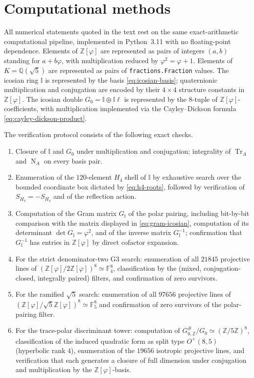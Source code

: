 \documentclass[12pt,oneside,english]{amsart}
\numberwithin{equation}{section}
\numberwithin{figure}{section}
\numberwithin{table}{section}
\theoremstyle{plain}
\theoremstyle{definition}
\theoremstyle{remark}
\newcommand{\ZZ}{\mathbb Z}
\newcommand{\QQ}{\mathbb Q}
\newcommand{\Zphi}{\mathbb Z[\varphi]}
\newcommand{\Tr}{\operatorname{Tr}}
\newcommand{\Norm}{\operatorname{N}}
\begin{document}
\section*{Computational methods}

All numerical statements quoted in the text rest on the same exact-arithmetic computational pipeline, implemented in Python~3.11 with no floating-point dependence. Elements of \(\Zphi\) are represented as pairs of integers \((a,b)\) standing for \(a+b\varphi\), with multiplication reduced by \(\varphi^2=\varphi+1\). Elements of \(K=\QQ(\sqrt5)\) are represented as pairs of \texttt{fractions.Fraction} values. The icosian ring \(\mathbb I\) is represented by the basis \eqref{eq:icosian-basis}; quaternionic multiplication and conjugation are encoded by their \(4\times 4\) structure constants in \(\Zphi\). The icosian double \(G_0=\mathbb I\oplus\mathbb I\ell\) is represented by the \(8\)-tuple of \(\Zphi\)-coefficients, with multiplication implemented via the Cayley--Dickson formula \eqref{eq:cayley-dickson-product}.

The verification protocol consists of the following exact checks.

\begin{enumerate}
\item[(P1)] Closure of \(\mathbb I\) and \(G_0\) under multiplication and conjugation; integrality of \(\Tr_A\) and \(\Norm_A\) on every basis pair.
\item[(P2)] Enumeration of the \(120\)-element \(H_4\) shell of \(\mathbb I\) by exhaustive search over the bounded coordinate box dictated by \eqref{eq:h4-roots}, followed by verification of \(S_{H_4}=-S_{H_4}\) and of the reflection action.
\item[(P3)] Computation of the Gram matrix \(G_{\mathbb I}\) of the polar pairing, including bit-by-bit comparison with the matrix displayed in \eqref{eq:gram-icosian}, computation of its determinant \(\det G_{\mathbb I}=\varphi^{2}\), and of the inverse matrix \(G_{\mathbb I}^{-1}\); confirmation that \(G_{\mathbb I}^{-1}\) has entries in \(\Zphi\) by direct cofactor expansion.
\item[(P4)] For the strict denominator-two G3 search: enumeration of all \(21845\) projective lines of \((\Zphi/2\Zphi)^{8}\simeq\mathbb F_{4}^{8}\), classification by the (mixed, conjugation-closed, integrally paired) filters, and confirmation of zero survivors.
\item[(P5)] For the ramified \(\sqrt5\) search: enumeration of all \(97656\) projective lines of \((\Zphi/\sqrt5\Zphi)^{8}\simeq\mathbb F_{5}^{8}\) and confirmation of zero survivors of the polar-pairing filter.
\item[(P6)] For the trace-polar discriminant tower: computation of \(G_{0,\ZZ}^{\#}/G_0\simeq(\ZZ/5\ZZ)^{8}\), classification of the induced quadratic form as split type \(O^{+}(8,5)\) (hyperbolic rank \(4\)), enumeration of the \(19656\) isotropic projective lines, and verification that each generates a closure of full dimension under conjugation and multiplication by the \(\Zphi\)-basis.
\end{enumerate}
\end{document}
